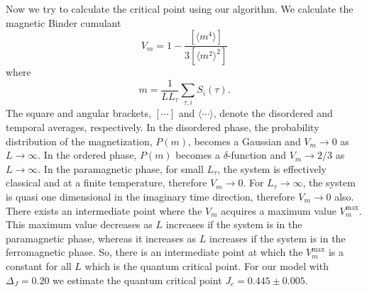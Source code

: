 \documentclass[aps,prl,twocolumn,10pt,notitlepage]{revtex4-1}
\begin{document}
Now we try to calculate the critical point using our algorithm. We calculate the magnetic Binder cumulant~\cite{binderPRB1984,binderPRB1986}
\begin{equation}
	V_m = 1 - \frac{[\langle m^4 \rangle]}{3[\langle m^2 \rangle^2]}
\end{equation}
where
\begin{equation}
	m = \frac{1}{L L_\tau} \sum_{\tau,i} S_{i}(\tau).
\end{equation}
The square and angular brackets, $[\cdots]$ and $\langle \cdots \rangle$, denote the disordered and temporal averages, respectively. In the disordered phase, the probability distribution of the magnetization, $P(m)$, becomes a Gaussian and $V_m \to 0$ as $L \to \infty$. In the ordered phase, $P(m)$ becomes a $\delta$-function and $V_m \to 2/3$ as $L \to \infty$. In the paramagnetic phase, for small $L_\tau$, the system is effectively classical and at a finite temperature, therefore $V_m \to 0$. For $L_\tau \to \infty$, the system is quasi one dimensional in the imaginary time direction, therefore $V_m \to 0$ also. There exists an intermediate point where the $V_m$ acquires a maximum value $V_m^\text{max}$. This maximum value decreases as $L$ increases if the system is in the paramagnetic phase, whereas it increases as $L$ increases if the system is in the ferromagnetic phase. So, there is an intermediate point at which the $V_m^\text{max}$ is a constant for all $L$ which is the quantum critical point. For our model with $\Delta_J = 0.20$ we estimate the quantum critical point $J_c = 0.445 \pm 0.005$.


\end{document}
